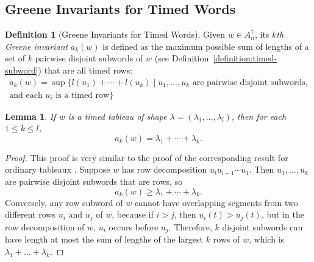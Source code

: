 \documentclass[10pt]{amsproc}
\newtheorem{lemma}[theorem]{Lemma}
\theoremstyle{definition}
\newtheorem{definition}[theorem]{Definition}
\theoremstyle{remark}
\begin{document}
\subsection{Greene Invariants for Timed Words}
\label{sec:timed-greene-invar}
\begin{definition}[Greene Invariants for Timed Words]
  \label{definition:timed-Greene-invars}
  Given $w\in A_n^\dagger$, its \emph{$k$th Greene invariant} $a_k(w)$ is defined as the maximum possible sum of lengths of a set of $k$ pairwise disjoint subwords of $w$ (see Definition~\ref{definition:timed-subword}) that are all timed rows:
  \begin{multline*}
    a_k(w) = \sup\{l(u_1)+\dotsb+l(u_k)\mid u_1,\dotsc,u_k \text{ are pairwise disjoint subwords,}\\ \text{and each $u_i$ is a timed row}\}
  \end{multline*}
\end{definition}
\begin{lemma}
  \label{lemma:tableau-shape-greene}
  If $w$ is a timed tableau of shape $\lambda=(\lambda_1,\dotsc,\lambda_l)$, then for each $1\leq k\leq l$,
  \begin{displaymath}
    a_k(w) = \lambda_1+\dotsb + \lambda_k.
  \end{displaymath}
\end{lemma}
\begin{proof}
  This proof is very similar to the proof of the corresponding result for ordinary tableaux \cite{Greene-schen,Lascoux}.
  Suppose $w$ has row decomposition $u_lu_{l-1}\dotsb u_1$.
  Then $u_1,\dotsc,u_k$ are pairwise disjoint subwords that are rows, so
  \begin{displaymath}
    a_k(w) \geq \lambda_1+\dotsb + \lambda_k.
  \end{displaymath}
  Conversely, any row subword of $w$ cannot have overlapping segments from two different rows $u_i$ and $u_j$ of $w$, because if $i>j$, then $u_i(t)>u_j(t)$, but in the row decomposition of $w$, $u_i$ occurs before $u_j$.
  Therefore, $k$ disjoint subwords can have length at most the sum of lengths of the largest $k$ rows of $w$, which is $\lambda_1+\dotsc+\lambda_k$.
\end{proof}
\end{document}
